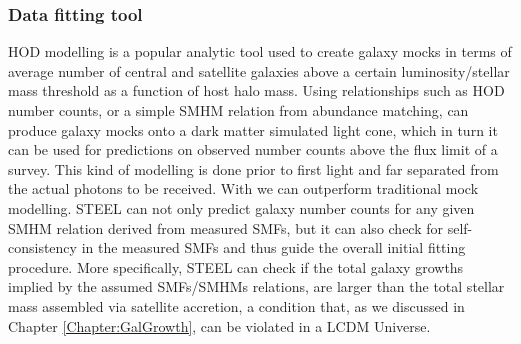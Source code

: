 \subsubsection{Data fitting tool}

HOD modelling is a popular analytic tool used to create galaxy mocks in terms of average number of central and satellite galaxies above a certain luminosity/stellar mass threshold as a function of host halo mass. Using relationships such as HOD number counts, or a simple SMHM relation from abundance matching, can produce galaxy mocks onto a dark matter simulated light cone, which in turn it can be used for predictions on observed number counts above the flux limit of a survey. This kind of modelling is done prior to first light and far separated from the actual photons to be received. With \steel we can outperform traditional mock modelling. STEEL can not only predict galaxy number counts for any given SMHM relation derived from measured SMFs, but it can also check for self-consistency in the measured SMFs and thus guide the overall initial fitting procedure. More specifically, STEEL can check if the total galaxy growths implied by the assumed SMFs/SMHMs relations, are larger than the total stellar mass assembled via satellite accretion, a condition that, as we discussed in Chapter \ref{Chapter:GalGrowth}, can be violated in a LCDM Universe.


